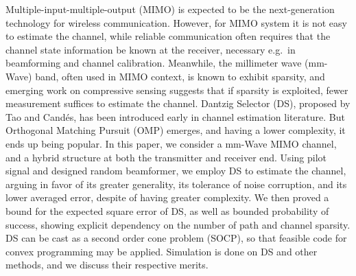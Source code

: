 
\starttitle [title={Abstract}]

Multiple-input-multiple-output (MIMO) is expected to be the next-generation technology for wireless communication.
However, for MIMO system it is not easy to estimate the channel, while reliable communication often requires that the channel state information be known at the receiver, necessary e.g.\ in beamforming and channel calibration.
Meanwhile, the millimeter wave (mm-Wave) band, often used in MIMO context, is known to exhibit sparsity, and emerging work on compressive sensing suggests that if sparsity is exploited, fewer measurement suffices to estimate the channel.
Dantzig Selector (DS), proposed by Tao and Cand\'es, has been introduced early in channel estimation literature.
But Orthogonal Matching Pursuit (OMP) emerges, and having a lower complexity, it ends up being popular.
In this paper, we consider a mm-Wave MIMO channel, and a hybrid structure at both the transmitter and receiver end.
Using pilot signal and designed random beamformer, we employ DS to estimate the channel, arguing in favor of its greater generality, its tolerance of noise corruption, and its lower averaged error, despite of having greater complexity.
We then proved a bound for the expected square error of DS, as well as bounded probability of success, showing explicit dependency on the number of path and channel sparsity.
DS can be cast as a second order cone problem (SOCP), so that feasible code for convex programming may be applied.
Simulation is done on DS and other methods, and we discuss their respective merits.


\stoptitle
